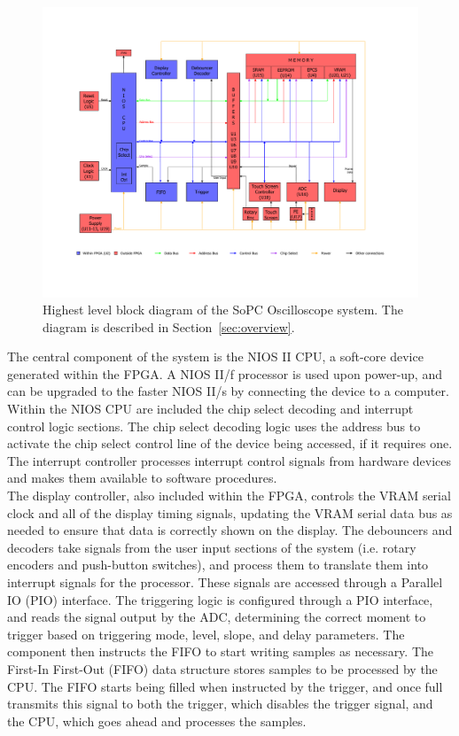 \documentclass[titlepage]{scrartcl}
\begin{document}
	\begin{figure}[h!]
	\vspace{-4cm}
	\centerline{\includegraphics[width=29cm, angle=90, origin=c]{img/block_diagram.pdf}}
                	\caption{Highest level block diagram of the SoPC Oscilloscope system. The diagram is described in Section~\ref{sec:overview}.}
               	\label{fig:main_blocks}
	\end{figure}
	
	The central component of the system is the NIOS II CPU, a soft-core device generated within the FPGA. A NIOS II/f processor is used upon power-up, and can be upgraded to the faster NIOS II/s by connecting the device to a computer. Within the NIOS CPU are included the chip select decoding and interrupt control logic sections. The chip select decoding logic uses the address bus to activate the chip select control line of the device being accessed, if it requires one. The interrupt controller processes interrupt control signals from hardware devices and makes them available to software procedures.\\

	The display controller, also included within the FPGA, controls the VRAM serial clock and all of the display timing signals, updating the VRAM serial data bus as needed to ensure that data is correctly shown on the display. The debouncers and decoders take signals from the user input sections of the system (i.e. rotary encoders and push-button switches), and process them to translate them into interrupt signals for the processor. These signals are accessed through a Parallel IO (PIO) interface. The triggering logic is configured through a PIO interface, and reads the signal output by the ADC, determining the correct moment to trigger based on triggering mode, level, slope, and delay parameters. The component then instructs the FIFO to start writing samples as necessary. The First-In First-Out (FIFO) data structure stores samples to be processed by the CPU. The FIFO starts being filled when instructed by the trigger, and once full transmits this signal to both the trigger, which disables the trigger signal, and the CPU, which goes ahead and processes the samples.\\
\end{document}
